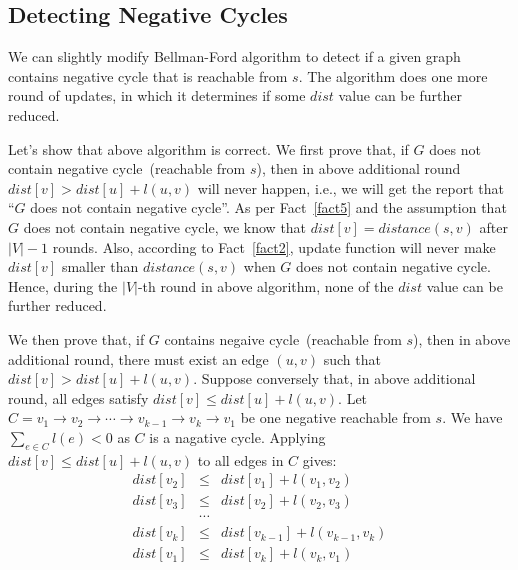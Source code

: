 \subsection*{Detecting Negative Cycles}

We can slightly modify Bellman-Ford algorithm to detect if a given graph contains negative cycle that is reachable from $s$.
The algorithm does one more round of updates, in which it determines if some $dist$ value can be further reduced.

\begin{minipage}{0.8\textwidth}
	\xxx
	\xxx
	\xxx
	\xxx
	\xxx
	\xxx
	\xxx
	\xxx
	\xxx
	\xxx
	\xxx
	\xxx
	\xxx
\end{minipage}


Let's show that above algorithm is correct.
We first prove that, if $G$ does not contain negative cycle~(reachable from $s$), then in above additional round $dist[v] > dist[u] + l(u,v)$ will never happen,
i.e., we will get the report that ``$G$ does not contain negative cycle''.
As per Fact~\ref{fact5} and the assumption that $G$ does not contain negative cycle, we know that $dist[v] = distance(s,v)$ after $|V| -1 $ rounds.
Also, according to Fact~\ref{fact2}, update function will never make $dist[v]$ smaller than $distance(s,v)$ when $G$ does not contain negative cycle.
Hence, during the $|V|$-th round in above algorithm, none of the $dist$ value can be further reduced.

We then prove that, if $G$ contains negaive cycle~(reachable from $s$), then in above additional round, there must exist an edge $(u,v)$ such that $dist[v] > dist[u] + l(u,v)$.
Suppose conversely that, in above additional round, all edges satisfy $dist[v] \le dist[u] + l(u,v)$.
Let $C = v_1 \to v_2 \to \cdots \to v_{k-1} \to v_k \to v_1$ be one negative reachable from $s$.  We have $\sum_{e\in C} l(e) < 0$ as $C$ is a nagative cycle.
Applying $dist[v] \le dist[u] + l(u,v)$ to all edges in $C$ gives:
\begin{displaymath}
\begin{array}{llllllllllllll}
	dist[v_2] & \le & dist[v_1] + l(v_1, v_2) \\
	dist[v_3] & \le & dist[v_2] + l(v_2, v_3) \\
	& \cdots & \\
	dist[v_k] & \le & dist[v_{k-1}] + l(v_{k-1}, v_k) \\
	dist[v_1] & \le & dist[v_{k}] + l(v_{k}, v_1)
\end{array}
\end{displaymath}

